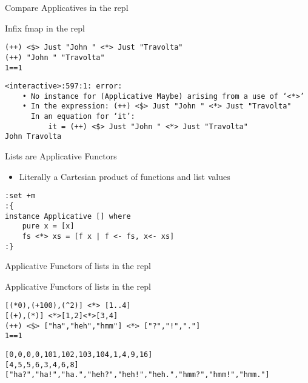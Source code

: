 \documentclass[presetation]{beamer}
\begin{document}
\begin{frame}[fragile,label={sec:org76bae1d}]{Compare Applicatives in the repl}
 \begin{block}{Infix fmap in the repl}
\begin{verbatim}
(++) <$> Just "John " <*> Just "Travolta"
(++) "John " "Travolta"
1==1 
\end{verbatim}

\begin{verbatim}
<interactive>:597:1: error:
    • No instance for (Applicative Maybe) arising from a use of ‘<*>’
    • In the expression: (++) <$> Just "John " <*> Just "Travolta"
      In an equation for ‘it’:
          it = (++) <$> Just "John " <*> Just "Travolta"
John Travolta
\end{verbatim}
\end{block}
\end{frame}

\begin{frame}[fragile,label={sec:orgae70591}]{Lists are Applicative Functors}
 \begin{definition}
\begin{itemize}
\item Literally a Cartesian product of functions and list values
\end{itemize}
\begin{verbatim}
:set +m
:{
instance Applicative [] where
    pure x = [x]
    fs <*> xs = [f x | f <- fs, x<- xs]
:}
\end{verbatim}
\end{definition}
\end{frame}

\begin{frame}[fragile,label={sec:org5c2dcab}]{Applicative Functors of lists in the repl}
 \begin{block}{Applicative Functors of lists in the repl}
\begin{verbatim}
[(*0),(+100),(^2)] <*> [1..4]
[(+),(*)] <*>[1,2]<*>[3,4]
(++) <$> ["ha","heh","hmm"] <*> ["?","!","."]
1==1
\end{verbatim}

\begin{verbatim}
[0,0,0,0,101,102,103,104,1,4,9,16]
[4,5,5,6,3,4,6,8]
["ha?","ha!","ha.","heh?","heh!","heh.","hmm?","hmm!","hmm."]
\end{verbatim}
\end{block}
\end{frame}
\end{document}

